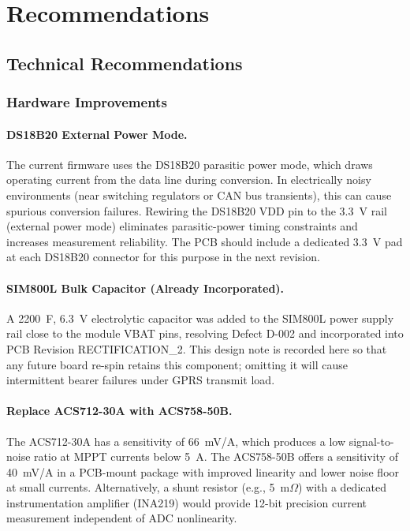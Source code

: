 \section{Recommendations}
\label{sec:recommendations}

\subsection{Technical Recommendations}

\subsubsection*{Hardware Improvements}

\paragraph{DS18B20 External Power Mode.}
The current firmware uses the DS18B20 parasitic power mode, which draws operating current from the data line during conversion. In electrically noisy environments (near switching regulators or CAN bus transients), this can cause spurious conversion failures. Rewiring the DS18B20 VDD pin to the 3.3~V rail (external power mode) eliminates parasitic-power timing constraints and increases measurement reliability. The PCB should include a dedicated 3.3~V pad at each DS18B20 connector for this purpose in the next revision.

\paragraph{SIM800L Bulk Capacitor (Already Incorporated).}
A 2200~\textmu{}F, 6.3~V electrolytic capacitor was added to the SIM800L power supply rail close to the module VBAT pins, resolving Defect D-002 and incorporated into PCB Revision RECTIFICATION\_2. This design note is recorded here so that any future board re-spin retains this component; omitting it will cause intermittent bearer failures under GPRS transmit load.

\paragraph{Replace ACS712-30A with ACS758-50B.}
The ACS712-30A has a sensitivity of 66~mV/A, which produces a low signal-to-noise ratio at MPPT currents below 5~A. The ACS758-50B offers a sensitivity of 40~mV/A in a PCB-mount package with improved linearity and lower noise floor at small currents. Alternatively, a shunt resistor (e.g., 5~m$\Omega$) with a dedicated instrumentation amplifier (INA219) would provide 12-bit precision current measurement independent of ADC nonlinearity.

